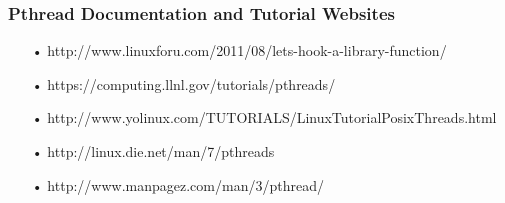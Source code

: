 \documentclass[a4paper,11pt]{article}
\begin{document}
\subsubsection*{Pthread Documentation and Tutorial Websites}
\begin{itemize}
\item[•]
http://www.linuxforu.com/2011/08/lets-hook-a-library-function/
\item[•]
https://computing.llnl.gov/tutorials/pthreads/
\item[•]
http://www.yolinux.com/TUTORIALS/LinuxTutorialPosixThreads.html
\item[•]
http://linux.die.net/man/7/pthreads
\item[•]
http://www.manpagez.com/man/3/pthread/
\end{itemize}
\end{document}
